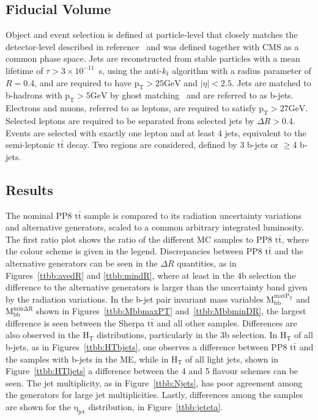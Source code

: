 \subsection{Fiducial Volume}
Object and event selection is defined at particle-level that closely matches the detector-level described in reference~\cite{HIGG-2017-03} and was defined together with CMS as a common phase space. Jets are reconstructed from stable particles with a mean lifetime of $\tau > 3\times 10^{-11}$~s, using the anti-$k_t$ algorithm with a radius parameter of $R=0.4$, and are required to have $\mathrm{p_{T}>25 GeV}$ and $|\eta|< 2.5$. Jets are matched to b-hadrons with $\mathrm{p_{T}>5 GeV}$ by ghost matching~\cite{Cacciari:2008gn} and are referred to as b-jets. Electrons and muons, referred to as leptons, are required to satisfy $\mathrm{p_{T}>27 GeV}$. Selected leptons are required to be separated from selected jets by $\Delta R>0.4$. Events are selected with exactly one lepton and at least 4 jets, equivalent to the semi-leptonic $\mathrm{t\bar{t}}$ decay.
Two regions are considered, defined by 3 b-jets or $\geq$4 b-jets.

\subsection{Results}
The nominal PP8 $\mathrm{t\bar{t}}$ sample is compared to its radiation uncertainty variations and alternative generators, scaled to a common arbitrary integrated luminosity.
The first ratio plot shows the ratio of the different MC samples to PP8 $\mathrm{t\bar{t}}$, where the colour scheme is given in the legend.
Discrepancies between PP8 $\mathrm{t\bar{t}}$ and the alternative generators can be seen in the $\Delta R$ quantities, as in Figures~\ref{ttbb:avedR} and \ref{ttbb:mindR}, where at least in the 4b selection the difference to the alternative generators is larger than the uncertainty band given by the radiation variations.  
In the b-jet pair invariant mass variables $\mathrm{M_{bb}^{max P_T}}$ and $\mathrm{M_{bb}^{min \Delta R}}$ shown in Figures~\ref{ttbb:MbbmaxPT} and~\ref{ttbb:MbbminDR}, the largest difference is seen between the Sherpa $\mathrm{t\bar{t}}$ and all other samples.
Differences are also observed in the $\mathrm{H_T}$ distributions, particularly in the 3b selection. In $\mathrm{H_T}$ of all b-jets, as in Figures~\ref{ttbb:HTbjets}, one observes a difference between PP8 $\mathrm{t\bar{t}}$ and the samples with b-jets in the ME, while in $\mathrm{H_T}$ of all light jets, shown in Figure~\ref{ttbb:HTljets} a difference between the 4 and 5 flavour schemes can be seen. The jet multiplicity, as in Figure~\ref{ttbb:Njets}, has poor agreement among the generators for large jet multiplicities.
Lastly, differences among the samples are shown for the $\mathrm{\eta_{jet}}$ distribution, in Figure~\ref{ttbb:jeteta}.

